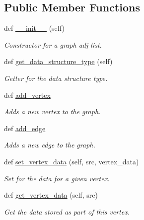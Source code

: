  \subsection*{Public Member Functions}
\begin{DoxyCompactItemize}
\item 
def \hyperlink{classbridges_1_1graph__adj__list_1_1_graph_adj_list_a8258a38ef234f4140b971e9fb7be7784}{\+\_\+\+\_\+init\+\_\+\+\_\+} (self)
\begin{DoxyCompactList}\small\item\em Constructor for a graph adj list. \end{DoxyCompactList}\item 
def \hyperlink{classbridges_1_1graph__adj__list_1_1_graph_adj_list_afe3d470247e6b64f38c0d5d51dece920}{get\+\_\+data\+\_\+structure\+\_\+type} (self)
\begin{DoxyCompactList}\small\item\em Getter for the data structure type. \end{DoxyCompactList}\item 
def \hyperlink{classbridges_1_1graph__adj__list_1_1_graph_adj_list_a61f1ad2a4f358a1e5137c189ba2b1de7}{add\+\_\+vertex}
\begin{DoxyCompactList}\small\item\em Adds a new vertex to the graph. \end{DoxyCompactList}\item 
def \hyperlink{classbridges_1_1graph__adj__list_1_1_graph_adj_list_a20a8e0801a34cce09ed429c58c1d851a}{add\+\_\+edge}
\begin{DoxyCompactList}\small\item\em Adds a new edge to the graph. \end{DoxyCompactList}\item 
def \hyperlink{classbridges_1_1graph__adj__list_1_1_graph_adj_list_a7b4669b353a04f6868710c22790bd263}{set\+\_\+vertex\+\_\+data} (self, src, vertex\+\_\+data)
\begin{DoxyCompactList}\small\item\em Set for the data for a given vertex. \end{DoxyCompactList}\item 
def \hyperlink{classbridges_1_1graph__adj__list_1_1_graph_adj_list_a0523e2e842042c131dcbe4fd66a6a296}{get\+\_\+vertex\+\_\+data} (self, src)
\begin{DoxyCompactList}\small\item\em Get the data stored as part of this vertex. \end{DoxyCompactList}\item 

\end{DoxyCompactItemize}
